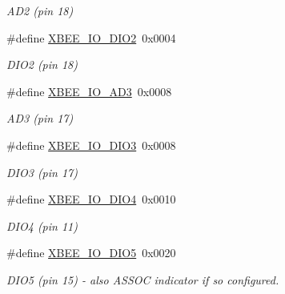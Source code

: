\begin{DoxyCompactItemize}
\begin{DoxyCompactList}\small\item\em A\+D2 (pin 18) \end{DoxyCompactList}\item 
\mbox{\label{group__xbee__io_ga9c373a42f64e66bfa38b2235fdfe6a25}} 
\#define \hyperlink{group__xbee__io_ga9c373a42f64e66bfa38b2235fdfe6a25}{X\+B\+E\+E\+\_\+\+I\+O\+\_\+\+D\+I\+O2}~0x0004
\begin{DoxyCompactList}\small\item\em D\+I\+O2 (pin 18) \end{DoxyCompactList}\item 
\mbox{\label{group__xbee__io_ga4fe43e2934ff1e51aa67eb98facc8073}} 
\#define \hyperlink{group__xbee__io_ga4fe43e2934ff1e51aa67eb98facc8073}{X\+B\+E\+E\+\_\+\+I\+O\+\_\+\+A\+D3}~0x0008
\begin{DoxyCompactList}\small\item\em A\+D3 (pin 17) \end{DoxyCompactList}\item 
\mbox{\label{group__xbee__io_ga9e539ad69c134bece49a356974defd98}} 
\#define \hyperlink{group__xbee__io_ga9e539ad69c134bece49a356974defd98}{X\+B\+E\+E\+\_\+\+I\+O\+\_\+\+D\+I\+O3}~0x0008
\begin{DoxyCompactList}\small\item\em D\+I\+O3 (pin 17) \end{DoxyCompactList}\item 
\mbox{\label{group__xbee__io_gaaa986d18e9f32ea28679ff354c503281}} 
\#define \hyperlink{group__xbee__io_gaaa986d18e9f32ea28679ff354c503281}{X\+B\+E\+E\+\_\+\+I\+O\+\_\+\+D\+I\+O4}~0x0010
\begin{DoxyCompactList}\small\item\em D\+I\+O4 (pin 11) \end{DoxyCompactList}\item 
\mbox{\label{group__xbee__io_ga51804d7450fba2e4200c39f5fba9ccf4}} 
\#define \hyperlink{group__xbee__io_ga51804d7450fba2e4200c39f5fba9ccf4}{X\+B\+E\+E\+\_\+\+I\+O\+\_\+\+D\+I\+O5}~0x0020
\begin{DoxyCompactList}\small\item\em D\+I\+O5 (pin 15) -\/ also A\+S\+S\+OC indicator if so configured. \end{DoxyCompactList}\item 

\end{DoxyCompactItemize}
